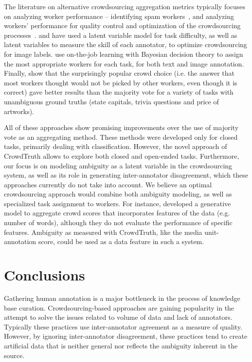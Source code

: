 The literature on alternative crowdsourcing aggregation metrics typically focuses on analyzing worker performance -- identifying spam workers~\cite{Bozzon:2013,Kittur2008,Ipeirotis:2010}, and analyzing workers' performance for quality control and optimization of the crowdsourcing processes~\cite{Singer:2013}. \cite{NIPS2009_3644} and \cite{welinder2010multidimensional} have used a latent variable model for task difficulty, as well as latent variables to measure the skill of each annotator, to optimize crowdsourcing for image labels. \cite{werling2015job} use on-the-job learning with Bayesian decision theory to assign the most appropriate workers for each task, for both text and image annotation. Finally, \cite{prelec2017solution} show that the surprisingly popular crowd choice (i.e. the answer that most workers thought would not be picked by other workers, even though it is correct) gave better results than the majority vote for a variety of tasks with unambiguous ground truths (state capitals, trivia questions and price of artworks).

All of these approaches show promising improvements over the use of majority vote as an aggregating method.  These methods were developed only for closed tasks, primarily dealing with classification.  However, the novel approach of CrowdTruth allows to explore both closed and open-ended tasks.  Furthermore, our focus is on modeling ambiguity as a latent variable in the crowdsourcing system, as well as its role in generating inter-annotator disagreement, which these approaches currently do not take into account. We believe an optimal crowdsourcing approach would combine both ambiguity modeling, as well as specialized task assignment to workers. For instance, \cite{felt2015early} developed a generative model to aggregate crowd scores that incorporates features of the data (e.g. number of words), although they do not evaluate the performance of specific features. Ambiguity as measured with CrowdTruth, like the media unit-annotation score, could be used as a data feature in such a system.


\section{Conclusions}
\label{sec:conclusions}

Gathering human annotation is a major bottleneck in the process of knowledge base curation. Crowdsourcing-based approaches are gaining popularity in the attempt to solve the issues related to volume of data and lack of annotators. Typically these practices use inter-annotator agreement as a measure of quality. However, by ignoring inter-annotator disagreement, these practices tend to create artificial data that is neither general nor reflects the ambiguity inherent in the source.

